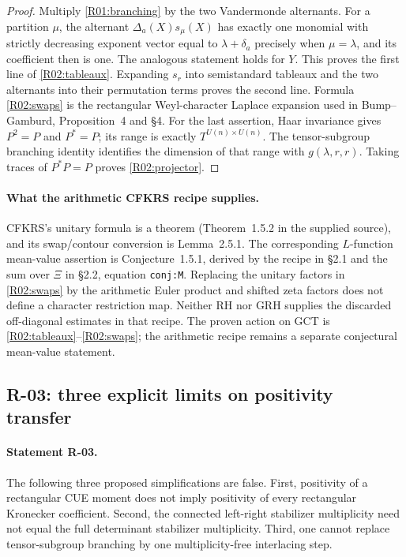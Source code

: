 \documentclass[11pt,a4paper]{article}
\theoremstyle{definition}\newtheorem{definition}{Definition}
\begin{document}
\begin{proof}
Multiply \eqref{R01:branching} by the two Vandermonde alternants.
For a partition $\mu$, the alternant $\Delta_a(X)s_\mu(X)$ has exactly one
monomial with strictly decreasing exponent vector equal to
$\lambda+\delta_a$ precisely when $\mu=\lambda$, and its coefficient then
is one. The analogous statement holds for $Y$. This proves the first line
of \eqref{R02:tableaux}. Expanding $s_r$ into semistandard tableaux and
the two alternants into their permutation terms proves the second line.
Formula \eqref{R02:swaps} is the rectangular Weyl-character Laplace expansion
used in Bump--Gamburd, Proposition~4 and \S4. For the last assertion,
Haar invariance gives $P^2=P$ and $P^*=P$; its range is exactly $T^{U(n)\times
U(n)}$. The tensor-subgroup branching identity identifies the dimension of
that range with $g(\lambda,r,r)$. Taking traces of $P^*P=P$ proves
\eqref{R02:projector}.
\end{proof}

\paragraph{What the arithmetic CFKRS recipe supplies.}
CFKRS's unitary formula is a theorem (Theorem~1.5.2 in the supplied source),
and its swap/contour conversion is Lemma~2.5.1. The corresponding
$L$-function mean-value assertion is Conjecture~1.5.1, derived by the
recipe in \S2.1 and the sum over $\Xi$ in \S2.2, equation
\texttt{conj:M}. Replacing the unitary factors in \eqref{R02:swaps} by the
arithmetic Euler product and shifted zeta factors does not define a
character restriction map. Neither RH nor GRH supplies the discarded
off-diagonal estimates in that recipe. The proven action on GCT is
\eqref{R02:tableaux}--\eqref{R02:swaps}; the arithmetic recipe remains a
separate conjectural mean-value statement.

\subsection{R-03: three explicit limits on positivity transfer}

\paragraph{Statement R-03.}
The following three proposed simplifications are false.
First, positivity of a rectangular CUE moment does not imply positivity
of every rectangular Kronecker coefficient. Second, the connected
left-right stabilizer multiplicity need not equal the full determinant
stabilizer multiplicity. Third, one cannot replace tensor-subgroup
branching by one multiplicity-free interlacing step.
\end{document}
